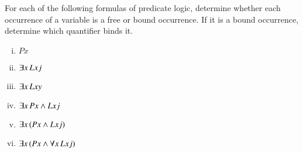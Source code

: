 \documentclass[nobib,nofonts]{tufte-handout}
\begin{document}
{\begin{minipage}{1.0\textwidth}
    \begin{exercise}
      For each of the following formulas of predicate logic, determine whether each occurrence of a variable is a free or bound occurrence. If it is a bound occurrence, determine which quantifier binds it.
      \begin{multicols}{2}
      \begin{enumerate}[(i)]
        \item $Px$
        \item $\exists x \thinspace Lxj$
        \item $\exists x \thinspace Lxy$
        \item $\exists x \thinspace Px \wedge Lxj$
        \item $\exists x \thinspace (Px \wedge Lxj)$
        \item $\exists x \thinspace (Px \wedge \forall x \thinspace Lxj)$
      \end{enumerate}
    \end{multicols}
    \end{exercise}
  \end{minipage}

}
\end{document}
